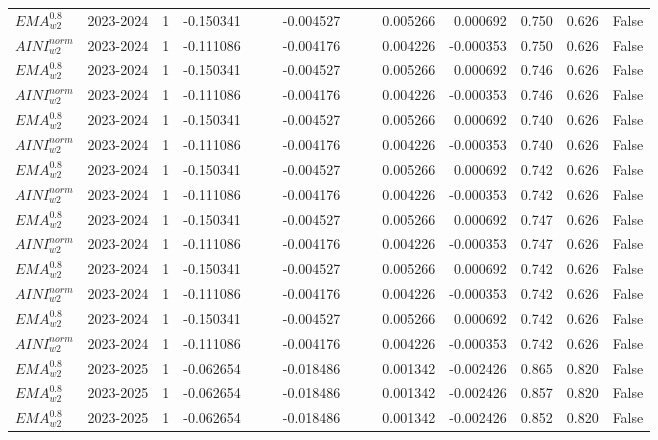 \begin{tabular}{@{}llrrrrrrrrrlll@{}}
$EMA^{0.8}_{w2}$ & 2023-2024 & 1 & -0.150341 &  &  & -0.004527 &  &  & 0.005266 & 0.000692 & 0.750 & 0.626 & False \\
$AINI^{norm}_{w2}$ & 2023-2024 & 1 & -0.111086 &  &  & -0.004176 &  &  & 0.004226 & -0.000353 & 0.750 & 0.626 & False \\
$EMA^{0.8}_{w2}$ & 2023-2024 & 1 & -0.150341 &  &  & -0.004527 &  &  & 0.005266 & 0.000692 & 0.746 & 0.626 & False \\
$AINI^{norm}_{w2}$ & 2023-2024 & 1 & -0.111086 &  &  & -0.004176 &  &  & 0.004226 & -0.000353 & 0.746 & 0.626 & False \\
$EMA^{0.8}_{w2}$ & 2023-2024 & 1 & -0.150341 &  &  & -0.004527 &  &  & 0.005266 & 0.000692 & 0.740 & 0.626 & False \\
$AINI^{norm}_{w2}$ & 2023-2024 & 1 & -0.111086 &  &  & -0.004176 &  &  & 0.004226 & -0.000353 & 0.740 & 0.626 & False \\
$EMA^{0.8}_{w2}$ & 2023-2024 & 1 & -0.150341 &  &  & -0.004527 &  &  & 0.005266 & 0.000692 & 0.742 & 0.626 & False \\
$AINI^{norm}_{w2}$ & 2023-2024 & 1 & -0.111086 &  &  & -0.004176 &  &  & 0.004226 & -0.000353 & 0.742 & 0.626 & False \\
$EMA^{0.8}_{w2}$ & 2023-2024 & 1 & -0.150341 &  &  & -0.004527 &  &  & 0.005266 & 0.000692 & 0.747 & 0.626 & False \\
$AINI^{norm}_{w2}$ & 2023-2024 & 1 & -0.111086 &  &  & -0.004176 &  &  & 0.004226 & -0.000353 & 0.747 & 0.626 & False \\
$EMA^{0.8}_{w2}$ & 2023-2024 & 1 & -0.150341 &  &  & -0.004527 &  &  & 0.005266 & 0.000692 & 0.742 & 0.626 & False \\
$AINI^{norm}_{w2}$ & 2023-2024 & 1 & -0.111086 &  &  & -0.004176 &  &  & 0.004226 & -0.000353 & 0.742 & 0.626 & False \\
$EMA^{0.8}_{w2}$ & 2023-2024 & 1 & -0.150341 &  &  & -0.004527 &  &  & 0.005266 & 0.000692 & 0.742 & 0.626 & False \\
$AINI^{norm}_{w2}$ & 2023-2024 & 1 & -0.111086 &  &  & -0.004176 &  &  & 0.004226 & -0.000353 & 0.742 & 0.626 & False \\
$EMA^{0.8}_{w2}$ & 2023-2025 & 1 & -0.062654 &  &  & -0.018486 &  &  & 0.001342 & -0.002426 & 0.865 & 0.820 & False \\
$EMA^{0.8}_{w2}$ & 2023-2025 & 1 & -0.062654 &  &  & -0.018486 &  &  & 0.001342 & -0.002426 & 0.857 & 0.820 & False \\
$EMA^{0.8}_{w2}$ & 2023-2025 & 1 & -0.062654 &  &  & -0.018486 &  &  & 0.001342 & -0.002426 & 0.852 & 0.820 & False \\

\end{tabular}
